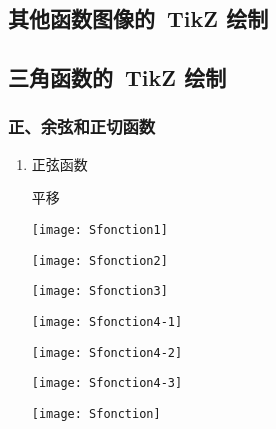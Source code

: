 \documentclass[
  paper=a4,
  pagesize=pdftex,
  twoside=false,
  toc=listof,
  BCOR=0pt,
  DIV=15,
  indent,
]{scrartcl}
\begin{document}
% 

\subsection{其他函数图像的~TikZ 绘制}

\subsection{三角函数的~TikZ 绘制}

\subsubsection{正、余弦和正切函数}

\begin{enumerate}

  \item 正弦函数

平移

 

 \texttt{[image: Sfonction1]}

 

 \texttt{[image: Sfonction2]}

 

 \texttt{[image: Sfonction3]}

 

 \texttt{[image: Sfonction4-1]}



 \texttt{[image: Sfonction4-2]}
 
 

 \texttt{[image: Sfonction4-3]}


 

 \texttt{[image: Sfonction]}

 



\end{enumerate}
\end{document}
